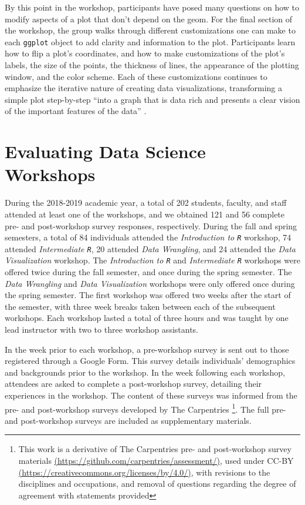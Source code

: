 \documentclass[12pt]{article}
\begin{document}
\quad By this point in the workshop, participants have posed many questions on
how to modify aspects of a plot that don't depend on the geom. For the final 
section of the workshop, the group walks through different customizations one 
can make to each \texttt{ggplot} object to add clarity and information to the 
plot. Participants learn how to flip a plot's coordinates, and how to make
customizations of the plot's labels, the size of the points, the thickness of
lines, the appearance of the plotting window, and the color scheme. Each of
these customizations continues to emphasize the iterative nature 
of creating data visualizations, transforming a simple plot step-by-step ``into
a graph that is data rich and presents a clear vision of the important features
of the data'' \citep[p.\ 262]{nolan-viz}.

\section{Evaluating Data Science Workshops}
\label{sec:implement}

\quad During the 2018-2019 academic year, a total of 202 students, faculty, and
staff attended at least one of the workshops, and we obtained 121 and 56 
complete pre- and post-workshop survey responses, respectively. During the fall 
and spring semesters, a total of 84 individuals attended the \emph{Introduction
to \texttt{R}} workshop, 74 attended \emph{Intermediate \texttt{R}}, 20 attended
\emph{Data Wrangling}, and 24 attended the \emph{Data Visualization} workshop.
The \emph{Introduction to \texttt{R}} and \emph{Intermediate \texttt{R}}
workshops were offered twice during the fall semester, and once during the
spring semester. The \emph{Data Wrangling} and \emph{Data Visualization}
workshops were only offered once during the spring semester. The first workshop
was offered two weeks after the start of the semester, with three week breaks 
taken between each of the subsequent workshops. Each workshop lasted a total of
three hours and was taught by one lead instructor with two to three workshop
assistants. 

\quad In the week prior to each workshop, a pre-workshop survey is
sent out to those registered through a Google Form. This survey details 
individuals' demographics and backgrounds prior to the workshop. In the week
following each workshop, attendees are asked to complete a post-workshop survey,
detailing their experiences in the workshop. The content of these surveys was
informed from the pre- and post-workshop surveys developed by The Carpentries
\footnote{This work is a derivative of The Carpentries pre- and post-workshop
survey materials \href{https://github.com/carpentries/assessment/}{(https://github.com/carpentries/assessment/)}, used under CC-BY \href{https://creativecommons.org/licenses/by/4.0/}{(https://creativecommons.org/licenses/by/4.0/)}, with revisions to the disciplines and occupations, and removal of questions
regarding the degree of agreement with statements provided}. The full pre- and
post-workshop surveys are included as supplementary materials.
\end{document}
